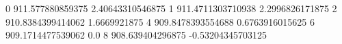0 911.577880859375 2.40643310546875
1 911.4711303710938 2.2996826171875
2 910.8384399414062 1.6669921875
4 909.8478393554688 0.6763916015625
6 909.1714477539062 0.0
8 908.639404296875 -0.53204345703125
